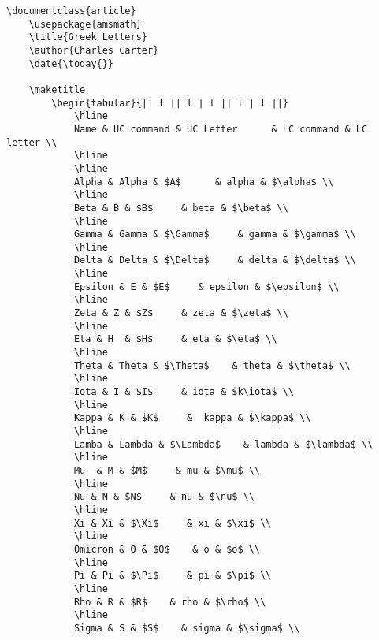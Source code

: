         \begin{verbatim}
\documentclass{article}
    \usepackage{amsmath}
    \title{Greek Letters}
    \author{Charles Carter}
    \date{\today{}}
 
    \maketitle
        \begin{tabular}{|| l || l | l || l | l ||}
            \hline
            Name & UC command & UC Letter      & LC command & LC letter \\
            \hline
            \hline
            Alpha & Alpha & $A$      & alpha & $\alpha$ \\
            \hline
            Beta & B & $B$     & beta & $\beta$ \\
            \hline
            Gamma & Gamma & $\Gamma$     & gamma & $\gamma$ \\
            \hline
            Delta & Delta & $\Delta$     & delta & $\delta$ \\
            \hline
            Epsilon & E & $E$     & epsilon & $\epsilon$ \\
            \hline
            Zeta & Z & $Z$     & zeta & $\zeta$ \\
            \hline
            Eta & H  & $H$     & eta & $\eta$ \\
            \hline
            Theta & Theta & $\Theta$    & theta & $\theta$ \\
            \hline
            Iota & I & $I$     & iota & $k\iota$ \\
            \hline
            Kappa & K & $K$     &  kappa & $\kappa$ \\
            \hline
            Lamba & Lambda & $\Lambda$    & lambda & $\lambda$ \\
            \hline
            Mu  & M & $M$     & mu & $\mu$ \\
            \hline
            Nu & N & $N$     & nu & $\nu$ \\
            \hline
            Xi & Xi & $\Xi$     & xi & $\xi$ \\
            \hline
            Omicron & O & $O$    & o & $o$ \\
            \hline
            Pi & Pi & $\Pi$     & pi & $\pi$ \\
            \hline
            Rho & R & $R$    & rho & $\rho$ \\
            \hline
            Sigma & S & $S$    & sigma & $\sigma$ \\

\end{verbatim}
